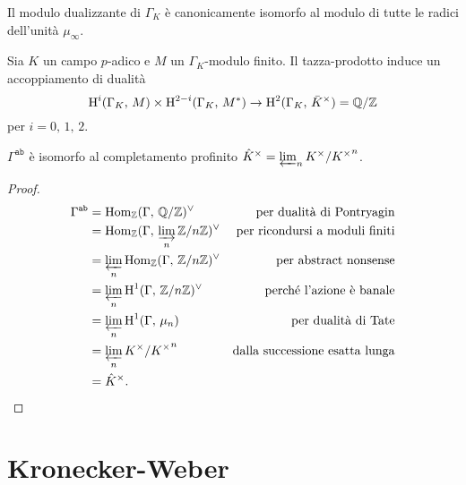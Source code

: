 \begin{proposition}
	Il modulo dualizzante di $ \Gamma_K $ è canonicamente isomorfo al modulo di tutte le radici dell'unità $ \mu_\infty $.
\end{proposition}

\begin{theorem}
	Sia $ K $ un campo $ p $-adico e $ M $ un $ \Gamma_K $-modulo finito. Il tazza-prodotto induce un accoppiamento di dualità
	\[ \operatorname{H}^i(\Gamma_K, \, M) \times \operatorname{H}^{2-i}(\Gamma_K, \, M^*) \to \operatorname{H}^2(\Gamma_K, \, \bar{K}^\times) = \mathbb{Q} / \mathbb{Z} \]
	per $ i = 0, \, 1, \, 2 $.
\end{theorem}


\begin{corollary}
	$ \Gamma^\mathtt{ab} $ è isomorfo al completamento profinito $ \hat{K}^\times = \varprojlim_n K^\times/ {K^\times}^n $.
\end{corollary}
\begin{proof}
	\begin{align*}
		\Gamma^\mathtt{ab}
		& = \operatorname{Hom}_{\mathbb{Z}}(\Gamma,\, \mathbb{Q}/\mathbb{Z})^\vee & \text{per dualità di Pontryagin} \\
		& = \operatorname{Hom}_{\mathbb{Z}}(\Gamma,\, \varinjlim_n \mathbb{Z}/n\mathbb{Z})^\vee & \text{per ricondursi a moduli finiti}\\ 
		& = \varprojlim_n \operatorname{Hom}_{\mathbb{Z}}(\Gamma,\, \mathbb{Z}/n\mathbb{Z})^\vee & \text{per abstract nonsense} \\
		& = \varprojlim_n \operatorname{H}^1(\Gamma,\, \mathbb{Z}/n\mathbb{Z})^\vee & \text{perché l'azione è banale} \\
		& = \varprojlim_n \operatorname{H}^1(\Gamma,\, \mu_n) & \text{per dualità di Tate} \\
		& = \varprojlim_n K^\times / {K^\times}^n & \text{dalla successione esatta lunga} \\
		& = \hat{K}^\times. 
	\end{align*}
\end{proof}

\section{Kronecker-Weber}